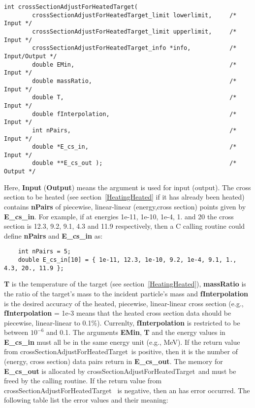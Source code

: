 \documentclass[11pt,twoside]{article}
\def\CRoutine{crossSectionAdjustForHeatedTarget}
\def\CRoutineS{\CRoutine \ }
\begin{document}
\begin{verbatim}
int crossSectionAdjustForHeatedTarget( 
        crossSectionAdjustForHeatedTarget_limit lowerlimit,     /* Input */
        crossSectionAdjustForHeatedTarget_limit upperlimit,     /* Input */
        crossSectionAdjustForHeatedTarget_info *info,           /* Input/Output */
        double EMin,                                            /* Input */ 
        double massRatio,                                       /* Input */
        double T,                                               /* Input */
        double fInterpolation,                                  /* Input */
        int nPairs,                                             /* Input */
        double *E_cs_in,                                        /* Input */
        double **E_cs_out );                                    /* Output */
\end{verbatim}
Here, {\bf Input} ({\bf Output}) means the argument is used for input (output).
The cross section to be heated (see section~\ref{HeatingHeated} if it has already been heated) contains {\bf nPairs} of piecewise, 
linear-linear (energy,cross section) points given by {\bf E\_cs\_in}. For example, if at energies 1e-11, 1e-10, 1e-4, 1. and 20
the cross section is 12.3, 9.2, 9.1, 4.3 and 11.9 respectively, then a C calling routine could define {\bf nPairs} and {\bf E\_cs\_in} as:
\label{EcsinExample}
\begin{verbatim}
    int nPairs = 5;
    double E_cs_in[10] = { 1e-11, 12.3, 1e-10, 9.2, 1e-4, 9.1, 1., 4.3, 20., 11.9 };
\end{verbatim}
{\bf T} is the temperature of the target (see section~\ref{HeatingHeated}), {\bf massRatio} is the ratio of the target's mass to the incident particle's mass
and {\bf fInterpolation} is the desired accuracy of the heated, piecewise, linear-linear cross section (e.g., {\bf fInterpolation} = 1e-3 means that
the heated cross section data should be piecewise, linear-linear to 0.1\%). Currenlty, {\bf fInterpolation} is restricted to be between
$10^{-6}$ and 0.1.
The arguments {\bf EMin}, {\bf T} and the energy values in {\bf E\_cs\_in} must all be in the same energy unit (e.g., MeV).
If the return value from \CRoutineS is positive, then it is the number of (energy, cross section) data pairs return in {\bf E\_cs\_out}.
The memory for {\bf E\_cs\_out} is allocated by \CRoutineS and must be freed by the calling routine. If the return value from \CRoutineS
is negative, then an has error occurred. The following table list the error values and their meaning:
\end{document}
